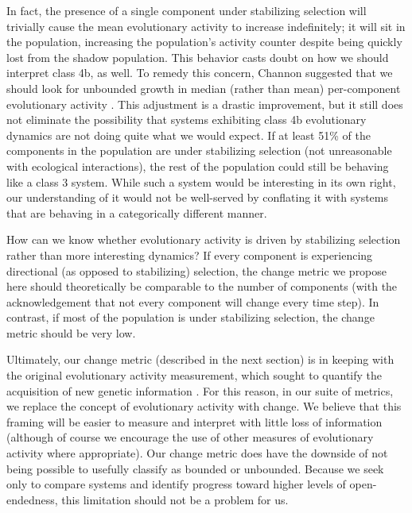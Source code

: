 \documentclass[letterpaper]{article}
\begin{document}
In fact, the presence of a single component under stabilizing selection will trivially cause the mean evolutionary activity to increase indefinitely; it will sit in the population, increasing the population's activity counter despite being quickly lost from the shadow population. This behavior casts doubt on how we should interpret class 4b, as well. To remedy this concern, Channon suggested that we should look for unbounded growth in median (rather than mean) per-component evolutionary activity \citep{channon_improving_2003}. This adjustment is a drastic improvement, but it still does not eliminate the possibility that systems exhibiting class 4b evolutionary dynamics are not doing quite what we would expect. If at least 51\% of the components in the population are under stabilizing selection (not unreasonable with ecological interactions), the rest of the population could still be behaving like a class 3 system. While such a system would be interesting in its own right, our understanding of it would not be well-served by conflating it with systems that are behaving in a categorically different manner.

How can we know whether evolutionary activity is driven by stabilizing selection rather than more interesting dynamics? If every component is experiencing directional (as opposed to stabilizing) selection, the change metric we propose here should theoretically be comparable to the number of components (with the acknowledgement that not every component will change every time step). In contrast, if most of the population is under stabilizing selection, the change metric should be very low.

Ultimately, our change metric (described in the next section) is in keeping with the original evolutionary activity measurement, which sought to quantify the acquisition of new genetic information \citep{langton_measurement_1992}. For this reason, in our suite of metrics, we replace the concept of evolutionary activity with change. We believe that this framing will be easier to measure and interpret with little loss of information (although of course we encourage the use of other measures of evolutionary activity where appropriate). Our change metric does have the downside of not being possible to usefully classify as bounded or unbounded. Because we seek only to compare systems and identify progress toward higher levels of open-endedness, this limitation should not be a problem for us.

\end{document}
